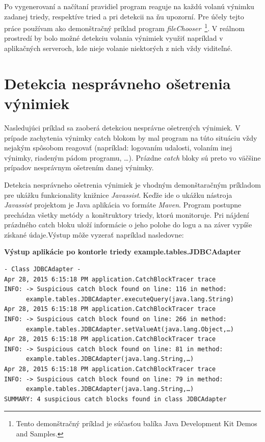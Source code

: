 \documentclass[11pt,final,oneside]{fithesis}
\newenvironment{example}[1]
{
\vspace{3mm}
\noindent\textbf{#1}
\vspace{2mm}
}
{
\vspace{3mm}
}
\begin{document}
Po vygenerovaní a načítaní pravidiel program reaguje na každú volanú výnimku zadanej triedy, respektíve tried a pri detekcii na ňu upozorní. Pre účely tejto práce používam ako demonštračný príklad program \textit{fileChooser}~\footnote{Tento demonštračný príklad je súčasťou balíka Java Development Kit Demos and Samples.}. V reálnom prostredí by bolo možné detekciu volania výnimiek využiť napríklad v aplikačných serveroch, kde nieje volanie niektorých z nich vždy viditeľné.

\section{Detekcia nesprávneho ošetrenia výnimiek}

Nasledujúci príklad sa zaoberá detekciou nesprávne ošetrených výnimiek. V prípade zachytenia výnimky catch blokom by mal program na túto situáciu vždy nejakým spôsobom reagovať (napríklad: logovaním udalosti, volaním inej výnimky, riadeným pádom programu, …). Prázdne \textit{catch} bloky sú preto vo väčšine prípadov nesprávnym ošetrením danej výnimky.

Detekcia nesprávneho ošetrenia výnimiek je vhodným demonštaračným príkladom pre ukážku funkcionality knižnice \textit{Javassist}. Keďže ide o ukážku nástroja \textit{Javassist} projektom je Java aplikácia vo formáte \textit{Maven}. Program postupne prechádza všetky metódy a konštruktory triedy, ktorú monitoruje. Pri nájdení prázdného catch bloku uloží informácie o jeho polohe do logu a na záver vypíše získané údaje.Výstup môže vyzerať napríklad nasledovne:

\begin{example}{Výstup aplikácie po kontorle triedy example.tables.JDBCAdapter}
\begin{verbatim}
- Class JDBCAdapter -
Apr 28, 2015 6:15:18 PM application.CatchBlockTracer trace
INFO: -> Suspicious catch block found on line: 116 in method:
      example.tables.JDBCAdapter.executeQuery(java.lang.String)
Apr 28, 2015 6:15:18 PM application.CatchBlockTracer trace
INFO: -> Suspicious catch block found on line: 266 in method:
      example.tables.JDBCAdapter.setValueAt(java.lang.Object,…)
Apr 28, 2015 6:15:18 PM application.CatchBlockTracer trace
INFO: -> Suspicious catch block found on line: 81 in method:
      example.tables.JDBCAdapter(java.lang.String,…)
Apr 28, 2015 6:15:18 PM application.CatchBlockTracer trace
INFO: -> Suspicious catch block found on line: 79 in method:
      example.tables.JDBCAdapter(java.lang.String,…)
SUMMARY: 4 suspicious catch blocks found in class JDBCAdapter
\end{verbatim}
\end{example}
\end{document}
